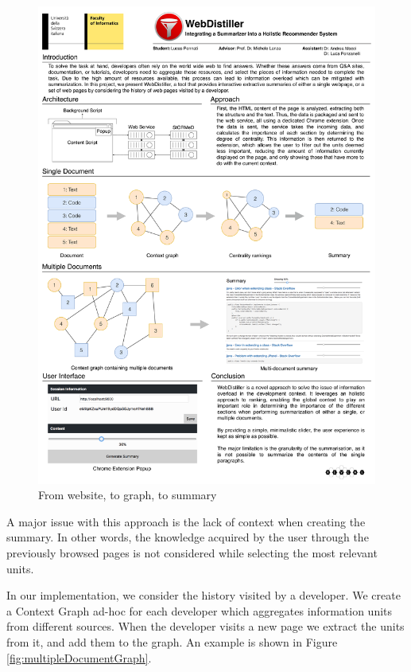 \begin{figure}[H]
\centering
\includegraphics[scale=0.2]{Figures/graphs}
\caption{From website, to graph, to summary}
\label{fig:graph}
\end{figure} 

A major issue with this approach is the lack of context when creating the summary. In other words, the knowledge acquired by the user through the previously browsed pages is not considered while selecting the most relevant units.

In our implementation, we consider the history visited by a developer. We create a Context Graph ad-hoc for each developer which aggregates information units from different sources. When the developer visits a new page we extract the units from it, and add them to the graph. An example is shown in Figure \ref{fig:multipleDocumentGraph}.


